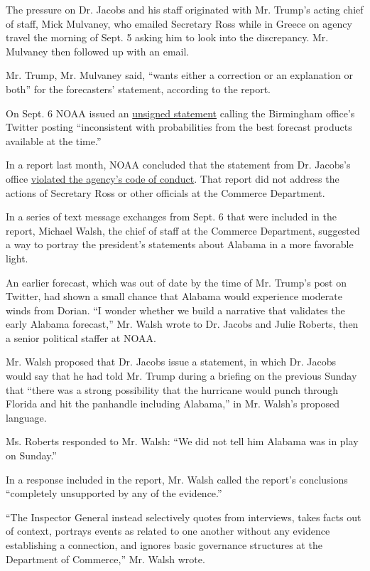 The pressure on Dr. Jacobs and his staff originated with Mr. Trump's
acting chief of staff, Mick Mulvaney, who emailed Secretary Ross while
in Greece on agency travel the morning of Sept. 5 asking him to look
into the discrepancy. Mr. Mulvaney then followed up with an email.

Mr. Trump, Mr. Mulvaney said, ``wants either a correction or an
explanation or both'' for the forecasters' statement, according to the
report.

On Sept. 6 NOAA issued an
\href{https://www.nytimes3xbfgragh.onion/2019/09/06/us/politics/trump-alabama-dorian.html}{unsigned
statement} calling the Birmingham office's Twitter posting
``inconsistent with probabilities from the best forecast products
available at the time.''

In a report last month, NOAA concluded that the statement from Dr.
Jacobs's office
\href{https://www.nytimes3xbfgragh.onion/2020/06/15/climate/noaa-sharpiegate-ethics-violation.html}{violated
the agency's code of conduct}. That report did not address the actions
of Secretary Ross or other officials at the Commerce Department.

In a series of text message exchanges from Sept. 6 that were included in
the report, Michael Walsh, the chief of staff at the Commerce
Department, suggested a way to portray the president's statements about
Alabama in a more favorable light.

An earlier forecast, which was out of date by the time of Mr. Trump's
post on Twitter, had shown a small chance that Alabama would experience
moderate winds from Dorian. ``I wonder whether we build a narrative that
validates the early Alabama forecast,'' Mr. Walsh wrote to Dr. Jacobs
and Julie Roberts, then a senior political staffer at NOAA.

Mr. Walsh proposed that Dr. Jacobs issue a statement, in which Dr.
Jacobs would say that he had told Mr. Trump during a briefing on the
previous Sunday that ``there was a strong possibility that the hurricane
would punch through Florida and hit the panhandle including Alabama,''
in Mr. Walsh's proposed language.

Ms. Roberts responded to Mr. Walsh: ``We did not tell him Alabama was in
play on Sunday.''

In a response included in the report, Mr. Walsh called the report's
conclusions ``completely unsupported by any of the evidence.''

``The Inspector General instead selectively quotes from interviews,
takes facts out of context, portrays events as related to one another
without any evidence establishing a connection, and ignores basic
governance structures at the Department of Commerce,'' Mr. Walsh wrote.

